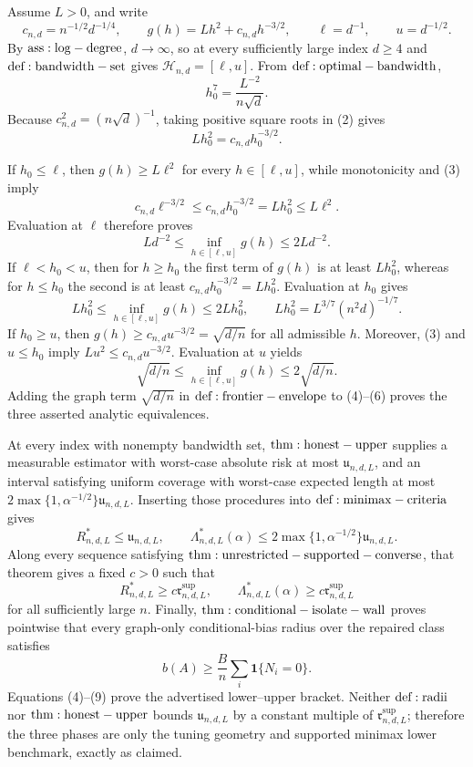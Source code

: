 Assume \(L>0\), and write
\[
 c_{n,d}=n^{-1/2}d^{-1/4},
 \qquad g(h)=Lh^2+c_{n,d}h^{-3/2},
 \qquad \ell=d^{-1},
 \qquad u=d^{-1/2}.
\tag{1}
\]
By \({\rm ass:log-degree}\), \(d\to\infty\), so at every sufficiently large index \(d\geq4\) and \({\rm def:bandwidth-set}\) gives \(\mathcal H_{n,d}=[\ell,u]\).  From \({\rm def:optimal-bandwidth}\),
\[
 h_0^7=\frac{L^{-2}}{n\sqrt d}.
\tag{2}
\]
Because \(c_{n,d}^2=(n\sqrt d)^{-1}\), taking positive square roots in (2) gives
\[
 Lh_0^2=c_{n,d}h_0^{-3/2}.
\tag{3}
\]

If \(h_0\leq\ell\), then \(g(h)\geq L\ell^2\) for every \(h\in[\ell,u]\), while monotonicity and (3) imply
\[
 c_{n,d}\ell^{-3/2}\leq c_{n,d}h_0^{-3/2}
 =Lh_0^2\leq L\ell^2.
\]
Evaluation at \(\ell\) therefore proves
\[
 Ld^{-2}\leq\inf_{h\in[\ell,u]}g(h)\leq2Ld^{-2}.
\tag{4}
\]
If \(\ell<h_0<u\), then for \(h\geq h_0\) the first term of \(g(h)\) is at least \(Lh_0^2\), whereas for \(h\leq h_0\) the second is at least \(c_{n,d}h_0^{-3/2}=Lh_0^2\).  Evaluation at \(h_0\) gives
\[
 Lh_0^2\leq\inf_{h\in[\ell,u]}g(h)\leq2Lh_0^2,
 \qquad Lh_0^2=L^{3/7}(n^2d)^{-1/7}.
\tag{5}
\]
If \(h_0\geq u\), then \(g(h)\geq c_{n,d}u^{-3/2}=\sqrt{d/n}\) for all admissible \(h\).  Moreover, (3) and \(u\leq h_0\) imply \(Lu^2\leq c_{n,d}u^{-3/2}\).  Evaluation at \(u\) yields
\[
 \sqrt{d/n}\leq\inf_{h\in[\ell,u]}g(h)\leq2\sqrt{d/n}.
\tag{6}
\]
Adding the graph term \(\sqrt{d/n}\) in \({\rm def:frontier-envelope}\) to (4)--(6) proves the three asserted analytic equivalences.

At every index with nonempty bandwidth set, \({\rm thm:honest-upper}\) supplies a measurable estimator with worst-case absolute risk at most \(\mathfrak u_{n,d,L}\), and an interval satisfying uniform coverage with worst-case expected length at most \(2\max\{1,\alpha^{-1/2}\}\mathfrak u_{n,d,L}\).  Inserting those procedures into \({\rm def:minimax-criteria}\) gives
\[
 R^*_{n,d,L}\leq\mathfrak u_{n,d,L},
 \qquad
 \Lambda^*_{n,d,L}(\alpha)
 \leq2\max\{1,\alpha^{-1/2}\}\mathfrak u_{n,d,L}.
\tag{7}
\]
Along every sequence satisfying \({\rm thm:unrestricted-supported-converse}\), that theorem gives a fixed \(c>0\) such that
\[
 R^*_{n,d,L}\geq c\mathfrak r^{\mathrm{sup}}_{n,d,L},
 \qquad
 \Lambda^*_{n,d,L}(\alpha)\geq c\mathfrak r^{\mathrm{sup}}_{n,d,L}
\tag{8}
\]
for all sufficiently large \(n\).  Finally, \({\rm thm:conditional-isolate-wall}\) proves pointwise that every graph-only conditional-bias radius over the repaired class satisfies
\[
 b(A)\geq\frac Bn\sum_i\mathbf1\{N_i=0\}.
\tag{9}
\]
Equations (4)--(9) prove the advertised lower--upper bracket.  Neither \({\rm def:radii}\) nor \({\rm thm:honest-upper}\) bounds \(\mathfrak u_{n,d,L}\) by a constant multiple of \(\mathfrak r^{\mathrm{sup}}_{n,d,L}\); therefore the three phases are only the tuning geometry and supported minimax lower benchmark, exactly as claimed.